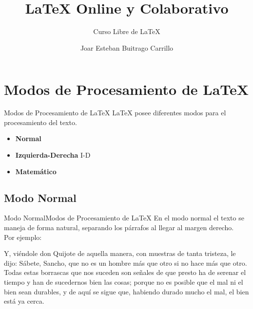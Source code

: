 \documentclass[12pt,aspectratio=43]{beamer}
\title{{\lmr\LaTeX} Online y Colaborativo}
\subtitle{Curso Libre de {\lmr\LaTeX}}
\author{Joar Esteban Buitrago Carrillo}
\institute{Universidad Nacional de Colombia}
\date{}
\makeatletter
\newcommand{\lmr}{\fontfamily{lmr}\selectfont}
\newcommand{\ifratio}[2]{
	\ifthenelse
	{\lengthtest{\beamer@paperwidth=16cm} \AND \lengthtest{\beamer@paperheight=9cm}}
	{#1}
	{#2} }
\makeatother
\begin{document}
\begin{frame}[plain]
\titlepage
\end{frame}

{
\begin{frame}
\ifratio
	{}
	{}
\end{frame}
}

\section{Modos de Procesamiento de {\LaTeX}}

\newcommand{\blindtext}{Y, viéndole don Quijote de aquella manera, con muestras de tanta tristeza, le dijo: Sábete, Sancho, que no es un hombre más que otro si no hace más que otro. Todas estas borrascas que nos suceden son señales de que presto ha de serenar el tiempo y han de sucedernos bien las cosas; porque no es posible que el mal ni el bien sean durables, y de aquí se sigue que, habiendo durado mucho el mal, el bien está ya cerca.}

\begin{frame}{Modos de Procesamiento de {\lmr\LaTeX}}{}
{\lmr\LaTeX} posee diferentes modos para el procesamiento del texto.\\[1em]

\begin{itemize}[<+->]
	\item \alert<1>{\bf Normal}
	\item \alert<2>{\bf Izquierda-Derecha} I-D
	\item \alert<3>{\bf Matemático}
\end{itemize}
\end{frame}

\subsection{Modo Normal}
\begin{frame}{Modo Normal}{Modos de Procesamiento de {\lmr\LaTeX}}
En el modo normal el texto se maneja de forma natural, separando los párrafos al llegar al margen derecho.\pause\\[1em]

Por ejemplo:\\[1em]

\begin{minipage}[c]{\linewidth}
	\lmr\blindtext
\end{minipage}
\end{frame}
\end{document}
